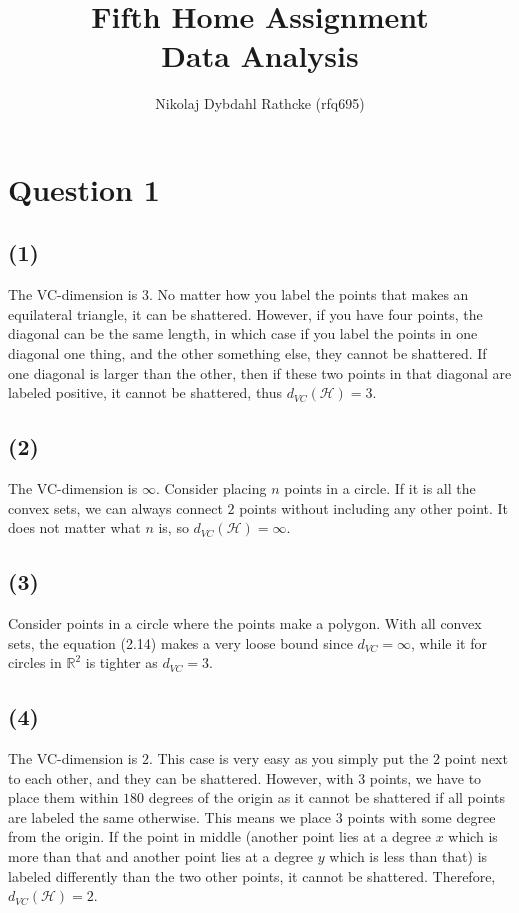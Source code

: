 \documentclass[a4paper]{article}
\author{Nikolaj Dybdahl Rathcke (rfq695)}
\title{Fifth Home Assignment \\ Data Analysis}
\begin{document}
\maketitle
\section*{Question 1}
\subsection*{(1)}
The VC-dimension is $3$. No matter how you label the points that makes an equilateral triangle, it can be shattered. However, if you have four points, the diagonal can be the same length, in which case if you label the points in one diagonal one thing, and the other something else, they cannot be shattered. If one diagonal is larger than the other, then if these two points in that diagonal are labeled positive, it cannot be shattered, thus $d_{VC}(\mathcal{H})=3$.


\subsection*{(2)}
The VC-dimension is $\infty$. Consider placing $n$ points in a circle. If it is all the convex sets, we can always connect $2$ points without including any other point. It does not matter what $n$ is, so $d_{VC}(\mathcal{H})=\infty $.


\subsection*{(3)}
Consider points in a circle where the points make a polygon. With all convex sets, the equation (2.14) makes a very loose bound since $d_{VC}=\infty$, while it for circles in $\mathbb{R}^2$ is tighter as $d_{VC}=3$.

\subsection*{(4)}
The VC-dimension is $2$. This case is very easy as you simply put the $2$ point next to each other, and they can be shattered. However, with $3$ points, we have to place them within $180$ degrees of the origin as it cannot be shattered if all points are labeled the same otherwise. This means we place $3$ points with some degree from the origin. If the point in middle (another point lies at a degree $x$ which is more than that and another point lies at a degree $y$ which is less than that) is labeled differently than the two other points, it cannot be shattered. Therefore, $d_{VC}(\mathcal{H})=2$.
\end{document}
